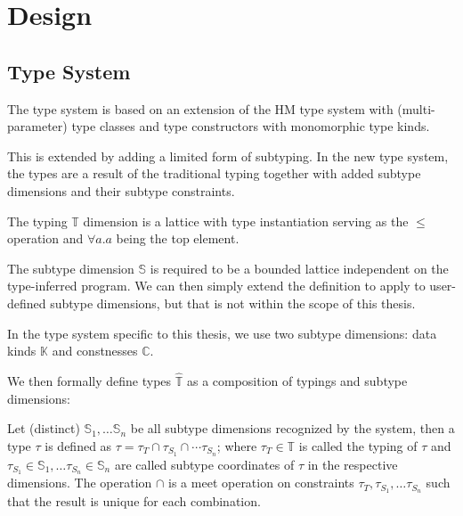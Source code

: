 \chapter{Design}


\section{Type System}

The type system is based on an extension of the HM type system with (multi-parameter) type classes and type constructors with monomorphic type kinds.

This is extended by adding a limited form of subtyping. In the new type system, the types are a result of the traditional typing together with added subtype dimensions and their subtype constraints.

\begin{defn}
    The typing $\mathbb{T}$ dimension is a lattice with type instantiation serving as the $\leq$ operation and $\forall a . a$ being the top element.
\end{defn}

\begin{defn}
    The subtype dimension $\mathbb{S}$ is required to be a bounded lattice independent on the type-inferred program. We can then simply extend the definition to apply to user-defined subtype dimensions, but that is not within the scope of this thesis.

    In the type system specific to this thesis, we use two subtype dimensions: data kinds $\mathbb{K}$ and constnesses $\mathbb{C}$.
\end{defn}

\begin{defn}[Types]
    We then formally define types $\widehat{\mathbb{T}}$ as a composition of typings and subtype dimensions:
    
    Let (distinct) $\mathbb{S}_1, \dots \mathbb{S}_n$ be all subtype dimensions recognized by the system, then a type $\tau$ is defined as $\tau = \tau_T \cap \tau_{S_1} \cap \cdots \tau_{S_n}$; where $\tau_T \in \mathbb{T}$ is called the typing of $\tau$ and $\tau_{S_1} \in \mathbb{S}_1, \dots \tau_{S_n} \in \mathbb{S}_n$ are called subtype coordinates of $\tau$ in the respective dimensions. The operation $\cap$ is a meet operation on constraints $\tau_T, \tau_{S_1}, \dots \tau_{S_n}$ such that the result is unique for each combination.
\end{defn}

